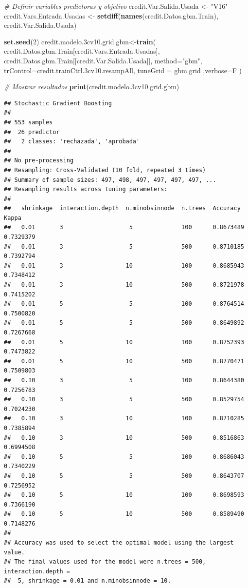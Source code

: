 \documentclass[
]{article}
\newenvironment{Shaded}{\begin{snugshade}}{\end{snugshade}}
\newcommand{\AttributeTok}[1]{\textcolor[rgb]{0.13,0.29,0.53}{#1}}
\newcommand{\CommentTok}[1]{\textcolor[rgb]{0.56,0.35,0.01}{\textit{#1}}}
\newcommand{\DecValTok}[1]{\textcolor[rgb]{0.00,0.00,0.81}{#1}}
\newcommand{\FloatTok}[1]{\textcolor[rgb]{0.00,0.00,0.81}{#1}}
\newcommand{\FunctionTok}[1]{\textcolor[rgb]{0.13,0.29,0.53}{\textbf{#1}}}
\newcommand{\NormalTok}[1]{#1}
\newcommand{\OtherTok}[1]{\textcolor[rgb]{0.56,0.35,0.01}{#1}}
\newcommand{\StringTok}[1]{\textcolor[rgb]{0.31,0.60,0.02}{#1}}
\begin{document}
\begin{Shaded}
\begin{Highlighting}[]
\CommentTok{\# Definir variables predictoras y objetivo}
\NormalTok{credit.Var.Salida.Usada }\OtherTok{\textless{}{-}} \StringTok{"V16"}
\NormalTok{credit.Vars.Entrada.Usadas }\OtherTok{\textless{}{-}} \FunctionTok{setdiff}\NormalTok{(}\FunctionTok{names}\NormalTok{(credit.Datos.gbm.Train), credit.Var.Salida.Usada)}

\FunctionTok{set.seed}\NormalTok{(}\DecValTok{2}\NormalTok{)}
\NormalTok{credit.modelo}\FloatTok{.3}\NormalTok{cv10.grid.gbm}\OtherTok{\textless{}{-}}\FunctionTok{train}\NormalTok{(}
\NormalTok{  credit.Datos.gbm.Train[credit.Vars.Entrada.Usadas],}
\NormalTok{  credit.Datos.gbm.Train[[credit.Var.Salida.Usada]],}
  \AttributeTok{method=}\StringTok{"gbm"}\NormalTok{, }\AttributeTok{trControl=}\NormalTok{credit.trainCtrl}\FloatTok{.3}\NormalTok{cv10.resampAll,}
  \AttributeTok{tuneGrid =}\NormalTok{ gbm.grid}
\NormalTok{,}\AttributeTok{verbose=}\NormalTok{F}
\NormalTok{)}

\CommentTok{\# Mostrar resultados}
\FunctionTok{print}\NormalTok{(credit.modelo}\FloatTok{.3}\NormalTok{cv10.grid.gbm)}
\end{Highlighting}
\end{Shaded}

\begin{verbatim}
## Stochastic Gradient Boosting 
## 
## 553 samples
##  26 predictor
##   2 classes: 'rechazada', 'aprobada' 
## 
## No pre-processing
## Resampling: Cross-Validated (10 fold, repeated 3 times) 
## Summary of sample sizes: 497, 498, 497, 497, 497, 497, ... 
## Resampling results across tuning parameters:
## 
##   shrinkage  interaction.depth  n.minobsinnode  n.trees  Accuracy   Kappa    
##   0.01       3                   5              100      0.8673489  0.7329379
##   0.01       3                   5              500      0.8710185  0.7392794
##   0.01       3                  10              100      0.8685943  0.7348412
##   0.01       3                  10              500      0.8721978  0.7415202
##   0.01       5                   5              100      0.8764514  0.7500820
##   0.01       5                   5              500      0.8649892  0.7267668
##   0.01       5                  10              100      0.8752393  0.7473822
##   0.01       5                  10              500      0.8770471  0.7509803
##   0.10       3                   5              100      0.8644380  0.7256783
##   0.10       3                   5              500      0.8529754  0.7024230
##   0.10       3                  10              100      0.8710285  0.7385894
##   0.10       3                  10              500      0.8516863  0.6994508
##   0.10       5                   5              100      0.8686043  0.7340229
##   0.10       5                   5              500      0.8643707  0.7256952
##   0.10       5                  10              100      0.8698593  0.7366190
##   0.10       5                  10              500      0.8589490  0.7148276
## 
## Accuracy was used to select the optimal model using the largest value.
## The final values used for the model were n.trees = 500, interaction.depth =
##  5, shrinkage = 0.01 and n.minobsinnode = 10.
\end{verbatim}
\end{document}
